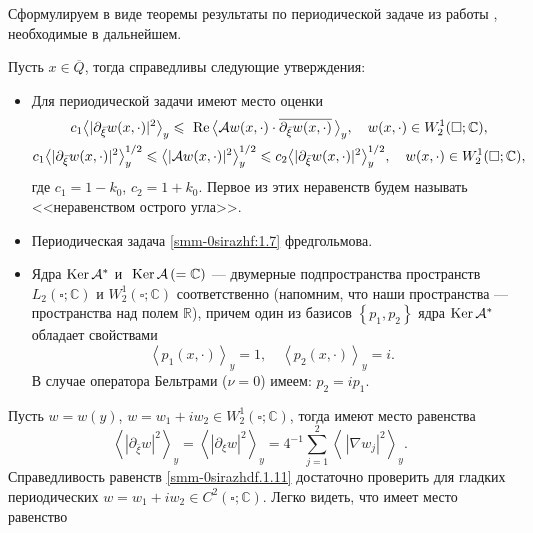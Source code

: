 Сформулируем в виде теоремы результаты по периодической задаче из работы \cite{smm-15}, необходимые в дальнейшем.



\begin{theorem}\label{smm2-th3}  Пусть $x\in\overline Q$, тогда справедливы следующие утверждения:
\begin{itemize}
	\item  {Для периодической задачи имеют место оценки}
	\begin{gather}\label{smm-0sirazhf:1.9}
		c_1\big<|\partial_{\bar{\xi}}w(x,\cdot)|^2\big>_y\leqslant \text{ Re\,}\big<\mathcal{A}w(x,\cdot)\cdot \overline{\partial_{\bar{\xi}}w(x,\cdot)}\,\big>_y,\quad  w(x,\cdot)\in W_2^1(\square;\mathbb{C}),\\
		c_1\big<|\partial_{\bar{\xi}}w(x,\cdot)|^2\big>_y^{1/2}\leqslant
		\big<|\mathcal{A}w(x,\cdot)|^2\big>_y^{1/2}\leqslant c_2\big<|\partial_{\bar{\xi}}w(x,\cdot)|^2\big>_y^{1/2},\quad  w(x,\cdot)\in W_2^1(\square;\mathbb{C}),\label{smm-0sirazhf:1.9'}
	\end{gather}
	{ где $c_1=1-k_0$, $c_2=1+k_0$. Первое из этих неравенств будем называть <<неравенством острого угла>>}.
	\item { Периодическая задача \eqref{smm-0sirazhf:1.7} фредгольмова.}
	\item {Ядра  $\text{Ker\,}\mathcal{A}^\ast$ и $\text{ Ker\,}\mathcal{A}\,(=\mathbb{C})$
		--- двумерные подпространства пространств $L_2(\square;\mathbb{C})$ и $W_2^1(\square;\mathbb{C})$ соответственно (напомним, что
		наши пространства --- пространства над полем $\mathbb{R}$),
		причем один из базисов $\left\{p_1,p_2\right\}$ ядра
		$\text{Ker\,}\mathcal{A}^\ast$ обладает свойствами
		\begin{equation}\label{smm-0sirazhdf:1.10}
			\left< p_1(x,\cdot)\right>_y=1,\quad \left< p_2(x,\cdot)\right>_y=i.
		\end{equation}
		В случае оператора Бельтрами ($\nu=0$) имеем: $p_2=ip_1$.}
\end{itemize}
\end{theorem}
Пусть $w=w(y)$, $w=w_1+iw_2\in W_2^1(\square;\mathbb{C})$, тогда имеют место равенства
\begin{equation}\label{smm-0sirazhdf.1.11}
	\left<|\partial_{\bar{\xi}}w|^2\right>_y=\left<|\partial_{\xi}w|^2\right>_y=4^{-1}\sum_{j=1}^2\left<
	\,|\nabla w_j|^2\right>_y.
\end{equation}
Справедливость равенств \eqref{smm-0sirazhdf.1.11} достаточно проверить  для  гладких периодических $w=w_1+iw_2\in C^2(\square;\mathbb{C})$. Легко видеть, что имеет место равенство
